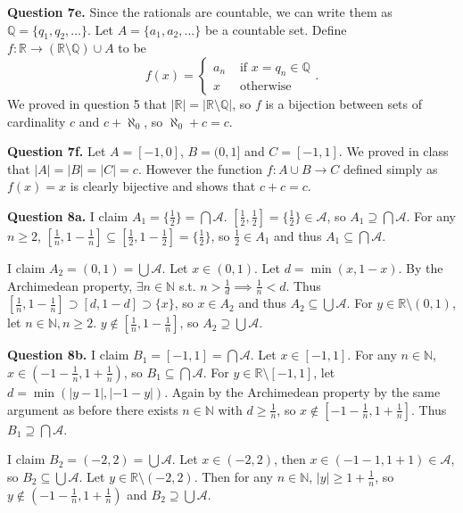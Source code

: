 \documentclass[letterpaper, reqno,11pt]{article}
\begin{document}
{\medskip\noindent\bf Question 7e.} Since the rationals are countable, we can write them as $\mathbb{Q}=\{q_1, q_2, \ldots\}$. Let $A=\{a_1, a_2, \ldots\}$ be a countable set. Define $f:\mathbb{R}\to (\mathbb{R}\setminus \mathbb{Q})\cup A$ to be
\[
f(x)=\begin{cases}
    a_n&\text{ if }x=q_n\in \mathbb{Q}\\
    x&\text{ otherwise}
\end{cases}
.\]
We proved in question 5 that $|\mathbb{R}|=|\mathbb{R}\setminus \mathbb{Q}|$, so $f$ is a bijection between sets of cardinality $c$ and $c+\aleph_0$, so $\aleph_0+c=c$.

{\medskip\noindent\bf Question 7f.} Let $A=[-1, 0]$, $B=(0, 1]$ and $C=[-1, 1]$. We proved in class that $|A|=|B|=|C|=c$. However the function $f:A\cup B\to C$ defined simply as $f(x)=x$ is clearly bijective and shows that $c+c=c$.

\newpage

{\medskip\noindent\bf Question 8a.} I claim $A_1=\{\frac{1}{2}\}=\bigcap \mathcal A$. $[\frac{1}{2}, \frac{1}{2}]=\{\frac{1}{2}\}\in\mathcal A$, so $A_1\supseteq \bigcap \mathcal A$. For any $n\geq 2$, $[\frac{1}{n}, 1-\frac{1}{n}]\subseteq [\frac{1}{2}, 1-\frac{1}{2}]=\{\frac{1}{2}\}$, so $\frac{1}{2}\in A_1$ and thus $A_1\subseteq \bigcap\mathcal A$.

I claim $A_2=(0, 1)=\bigcup\mathcal A$. Let $x\in (0, 1)$. Let $d=\min\left( x, 1-x \right) $. By the Archimedean property, $\exists n\in \mathbb{N}$ s.t. $n> \frac{1}{d}\implies \frac{1}{n}< d$. Thus $[\frac{1}{n}, 1-\frac{1}{n}]\supset [d, 1-d]\supset \{x\}$, so $x\in A_2$ and thus $A_2\subseteq \bigcup \mathcal A$. For $y\in \mathbb{R}\setminus (0,1)$, let $n\in \mathbb{N}, n\geq 2$. $y\notin[\frac{1}{n}, 1-\frac{1}{n}]$, so $A_2\supseteq \bigcup\mathcal A$.

{\medskip\noindent\bf Question 8b.} I claim $B_1=[-1, 1]=\bigcap\mathcal A$. Let $x\in [-1, 1]$. For any $n\in \mathbb{N}$, $x\in\left(-1-\frac{1}{n}, 1+\frac{1}{n}\right)$, so $B_1\subseteq \bigcap\mathcal A$. For $y\in \mathbb{R}\setminus [-1, 1]$, let $d=\min\left( |y-1|, |-1-y| \right) $. Again by the Archimedean property by the same argument as before there exists $n\in \mathbb{N}$ with $d\geq \frac{1}{n}$, so $x\notin [-1-\frac{1}{n}, 1+\frac{1}{n} ]$. Thus $B_1\supseteq\bigcap\mathcal A$.

I claim $B_2=(-2, 2)=\bigcup\mathcal A$. Let $x\in (-2, 2)$, then $x\in(-1-1, 1+1)\in\mathcal A$, so $B_2\subseteq\bigcup\mathcal A$. Let $y\in \mathbb{R}\setminus (-2, 2)$. Then for any $n\in \mathbb{N}$, $|y|\geq 1+\frac{1}{n}$, so $y\notin(-1-\frac{1}{n}, 1+\frac{1}{n})$ and $B_2\supseteq\bigcup\mathcal A$.
\end{document}
